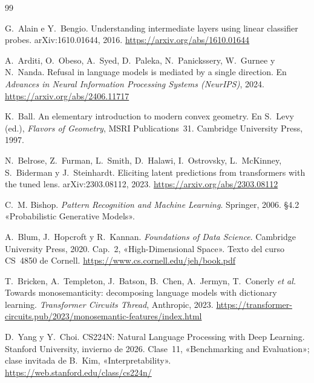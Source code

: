 \begin{thebibliography}{99}
\small

G.~Alain e Y.~Bengio.
\newblock Understanding intermediate layers using linear classifier probes.
\newblock arXiv:1610.01644, 2016.
\newblock \url{https://arxiv.org/abs/1610.01644}

A.~Arditi, O.~Obeso, A.~Syed, D.~Paleka, N.~Panickssery, W.~Gurnee y N.~Nanda.
\newblock Refusal in language models is mediated by a single direction.
\newblock En \emph{Advances in Neural Information Processing Systems (NeurIPS)}, 2024.
\newblock \url{https://arxiv.org/abs/2406.11717}

K.~Ball.
\newblock An elementary introduction to modern convex geometry.
\newblock En S.~Levy (ed.), \emph{Flavors of Geometry}, MSRI Publications~31. Cambridge University Press, 1997.

N.~Belrose, Z.~Furman, L.~Smith, D.~Halawi, I.~Ostrovsky, L.~McKinney, S.~Biderman y J.~Steinhardt.
\newblock Eliciting latent predictions from transformers with the tuned lens.
\newblock arXiv:2303.08112, 2023.
\newblock \url{https://arxiv.org/abs/2303.08112}

C.~M. Bishop.
\newblock \emph{Pattern Recognition and Machine Learning}.
\newblock Springer, 2006.
\newblock §4.2 «Probabilistic Generative Models».

A.~Blum, J.~Hopcroft y R.~Kannan.
\newblock \emph{Foundations of Data Science}.
\newblock Cambridge University Press, 2020.
\newblock Cap.~2, «High-Dimensional Space». Texto del curso CS~4850 de Cornell.
\newblock \url{https://www.cs.cornell.edu/jeh/book.pdf}

T.~Bricken, A.~Templeton, J.~Batson, B.~Chen, A.~Jermyn, T.~Conerly \emph{et al.}
\newblock Towards monosemanticity: decomposing language models with dictionary learning.
\newblock \emph{Transformer Circuits Thread}, Anthropic, 2023.
\newblock \url{https://transformer-circuits.pub/2023/monosemantic-features/index.html}

D.~Yang y Y.~Choi.
\newblock CS224N: Natural Language Processing with Deep Learning.
\newblock Stanford University, invierno de 2026. Clase~11, «Benchmarking and Evaluation»; clase invitada de B.~Kim, «Interpretability».
\newblock \url{https://web.stanford.edu/class/cs224n/}


\end{thebibliography}
